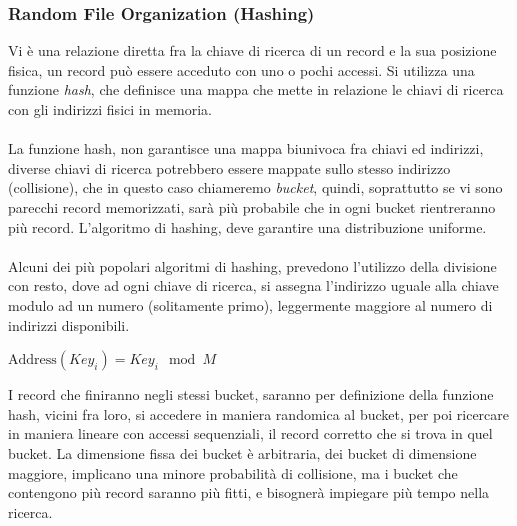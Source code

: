 \documentclass[12pt, letterpaper]{article}
\newcommand{\acc}{\\\hphantom{}\\}
\begin{document}
\subsubsection{Random File Organization (Hashing)}
Vi è una relazione diretta fra la chiave di ricerca di un record e la sua posizione fisica, un record può 
essere acceduto con uno o pochi accessi. Si utilizza una funzione \textit{hash}, che definisce una mappa 
che mette in relazione le chiavi di ricerca con gli indirizzi fisici in memoria. \acc La funzione hash, non garantisce 
una mappa biunivoca fra chiavi ed indirizzi, diverse chiavi di ricerca potrebbero essere mappate sullo stesso 
indirizzo (collisione), che in questo caso chiameremo \textit{bucket}, quindi, soprattutto se vi sono parecchi record memorizzati, sarà 
più probabile che in ogni bucket rientreranno più record. L'algoritmo di hashing, deve garantire una distribuzione uniforme.\acc 
Alcuni dei più popolari algoritmi di hashing, prevedono l'utilizzo della divisione con resto, dove ad ogni chiave di ricerca, 
si assegna l'indirizzo uguale alla chiave modulo ad un numero (solitamente primo), leggermente maggiore al numero di indirizzi 
disponibili.\begin{center}
    \(\text{Address}(Key_i)= Key_i \mod M \)
\end{center}
I record che finiranno negli stessi bucket, saranno per definizione della funzione hash, vicini fra loro, si accedere in 
maniera randomica al bucket, per poi ricercare in maniera lineare con accessi sequenziali, il record corretto che si trova 
in quel bucket. La dimensione fissa dei bucket è arbitraria, dei bucket di dimensione maggiore, implicano una minore probabilità 
di collisione, ma i bucket che contengono più record saranno più fitti, e bisognerà impiegare più tempo nella ricerca. 
\begin{figure}[h]
\end{figure}
\end{document}
